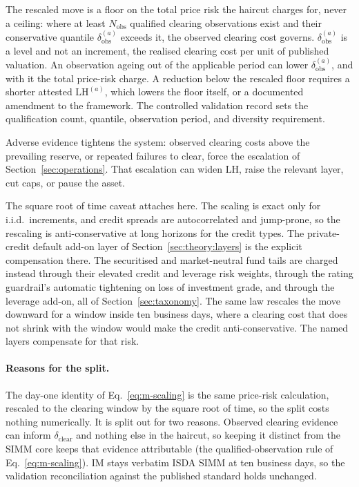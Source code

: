 The rescaled move is a floor on the total price risk the haircut charges for, never a ceiling: where at least $N_{\mathrm{obs}}$ qualified clearing observations exist and their conservative quantile $\delta_{\mathrm{obs}}^{(a)}$ exceeds it, the observed clearing cost governs. $\delta_{\mathrm{obs}}^{(a)}$ is a level and not an increment, the realised clearing cost per unit of published valuation. An observation ageing out of the applicable period can lower $\delta_{\mathrm{obs}}^{(a)}$, and with it the total price-risk charge. A reduction below the rescaled floor requires a shorter attested $\mathrm{LH}^{(a)}$, which lowers the floor itself, or a documented amendment to the framework. The controlled validation record sets the qualification count, quantile, observation period, and diversity requirement.

Adverse evidence tightens the system: observed clearing costs above the prevailing reserve, or repeated failures to clear, force the escalation of Section~\ref{sec:operations}. That escalation can widen $\mathrm{LH}$, raise the relevant layer, cut caps, or pause the asset.

The square root of time caveat attaches here. The scaling is exact only for i.i.d.\ increments, and credit spreads are autocorrelated and jump-prone, so the rescaling is anti-conservative at long horizons for the credit types. The private-credit default add-on layer of Section~\ref{sec:theory:layers} is the explicit compensation there. The securitised and market-neutral fund tails are charged instead through their elevated credit and leverage risk weights, through the rating guardrail's automatic tightening on loss of investment grade, and through the leverage add-on, all of Section~\ref{sec:taxonomy}. The same law rescales the move downward for a window inside ten business days, where a clearing cost that does not shrink with the window would make the credit anti-conservative. The named layers compensate for that risk.

\paragraph{Reasons for the split.} The day-one identity of Eq.~\eqref{eq:m-scaling} is the same price-risk calculation, rescaled to the clearing window by the square root of time, so the split costs nothing numerically. It is split out for two reasons. Observed clearing evidence can inform $\delta_{\mathrm{clear}}$ and nothing else in the haircut, so keeping it distinct from the SIMM core keeps that evidence attributable (the qualified-observation rule of Eq.~\eqref{eq:m-scaling}). $\mathrm{IM}$ stays verbatim ISDA SIMM at ten business days, so the validation reconciliation against the published standard holds unchanged.

